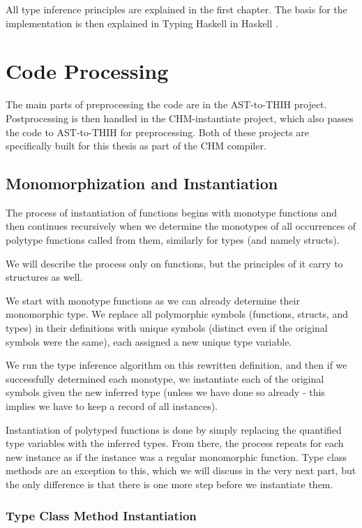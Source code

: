 All type inference principles are explained in the first chapter. The basis for the implementation is then explained in Typing Haskell in Haskell \cite{jones1999typing}.

\section{Code Processing}

The main parts of preprocessing the code are in the AST-to-THIH project. Postprocessing is then handled in the CHM-instantiate project, which also passes the code to AST-to-THIH for preprocessing. Both of these projects are specifically built for this thesis as part of the CHM compiler.

\subsection{Monomorphization and Instantiation}

The process of instantiation of functions begins with monotype functions and then continues recursively when we determine the monotypes of all occurrences of polytype functions called from them, similarly for types (and namely structs).

We will describe the process only on functions, but the principles of it carry to structures as well.

We start with monotype functions as we can already determine their monomorphic type. We replace all polymorphic symbols (functions, structs, and types) in their definitions with unique symbols (distinct even if the original symbols were the same), each assigned a new unique type variable.

We run the type inference algorithm on this rewritten definition, and then if we successfully determined each monotype, we instantiate each of the original symbols given the new inferred type (unless we have done so already - this implies we have to keep a record of all instances).

Instantiation of polytyped functions is done by simply replacing the quantified type variables with the inferred types. From there, the process repeats for each new instance as if the instance was a regular monomorphic function. Type class methods are an exception to this, which we will discuss in the very next part, but the only difference is that there is one more step before we instantiate them.

\subsubsection{Type Class Method Instantiation}

